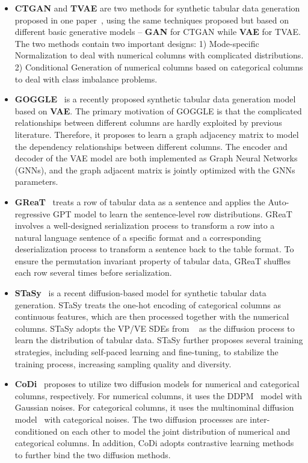 \begin{itemize}
    \item \textbf{CTGAN} and \textbf{TVAE} are two methods for synthetic tabular data generation proposed in one paper~\citep{ctgan}, using the same techniques proposed but based on different basic generative models -- \textbf{GAN} for CTGAN while \textbf{VAE} for TVAE. The two methods contain two important designs: 1) Mode-specific Normalization to deal with numerical columns with complicated distributions. 2) Conditional Generation of numerical columns based on categorical columns to deal with class imbalance problems. 
    \item \textbf{GOGGLE}~\citep{goggle} is a recently proposed synthetic tabular data generation model based on \textbf{VAE}. The primary motivation of GOGGLE is that the complicated relationships between different columns are hardly exploited by previous literature. Therefore, it proposes to learn a graph adjacency matrix to model the dependency relationships between different columns. The encoder and decoder of the VAE model are both implemented as Graph Neural Networks (GNNs), and the graph adjacent matrix is jointly optimized with the GNNs parameters.
    \item \textbf{GReaT}~\citep{great} treats a row of tabular data as a sentence and applies the Auto-regressive GPT model to learn the sentence-level row distributions. GReaT involves a well-designed serialization process to transform a row into a natural language sentence of a specific format and a corresponding deserialization process to transform a sentence back to the table format. To ensure the permutation invariant property of tabular data, GReaT shuffles each row several times before serialization. 
    \item \textbf{STaSy}~\citep{stasy} is a recent diffusion-based model for synthetic tabular data generation. STaSy treats the one-hot encoding of categorical columns as continuous features, which are then processed together with the numerical columns. STaSy adopts the VP/VE SDEs from ~\citet{vp} as the diffusion process to learn the distribution of tabular data. STaSy further proposes several training strategies, including self-paced learning and fine-tuning, to stabilize the training process, increasing sampling quality and diversity.
    \item \textbf{CoDi}~\citep{codi} proposes to utilize two diffusion models for numerical and categorical columns, respectively. For numerical columns, it uses the DDPM~\citep{ddpm} model with Gaussian noises. For categorical columns, it uses the multinominal diffusion model~\citep{multinominal_diffusion} with categorical noises. The two diffusion processes are inter-conditioned on each other to model the joint distribution of numerical and categorical columns. In addition, CoDi adopts contrastive learning methods to further bind the two diffusion methods.

\end{itemize}
